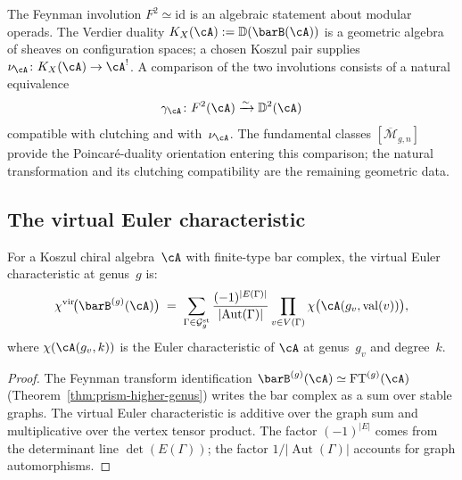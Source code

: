 \begin{remark}%
\label{rem:feynman-vs-verdier}
The Feynman involution $F^2 \simeq \mathrm{id}$ is an algebraic
statement about modular operads. The Verdier duality
$K_X(\cA):=\mathbb{D}(\barB(\cA))$ is a geometric algebra of sheaves
on configuration spaces; a chosen Koszul pair supplies
$\nu_\cA\colon K_X(\cA)\to\cA^!$.  A comparison of the two
involutions consists of a natural equivalence
\[
\gamma_\cA\colon F^2(\cA)\xrightarrow{\sim}
\mathbb D^2(\cA)
\]
compatible with clutching and with~$\nu_\cA$.  The fundamental classes
$[\overline{\mathcal{M}}_{g,n}]$ provide the Poincar\'e-duality
orientation entering this comparison; the natural transformation
and its clutching compatibility are the remaining geometric data.
\end{remark}

\subsection{The virtual Euler characteristic}
\label{subsec:virtual-euler-char}

\begin{theorem}\label{thm:virtual-euler-char}
For a Koszul chiral algebra~$\cA$ with finite-type bar complex,
the virtual Euler characteristic at genus~$g$ is:
\begin{equation}\label{eq:virtual-euler-graph}
\chi^{\mathrm{vir}}\!\bigl(\barB^{(g)}(\cA)\bigr)
\;=\;
\sum_{\Gamma \in \mathcal{G}_g^{\mathrm{st}}}
\frac{(-1)^{|E(\Gamma)|}}{|\!\operatorname{Aut}(\Gamma)|}
\prod_{v \in V(\Gamma)}
\chi\bigl(\cA(g_v, \mathrm{val}(v))\bigr),
\end{equation}
where $\chi(\cA(g_v, k))$ is the Euler characteristic of
$\cA$ at genus~$g_v$ and degree~$k$.
\end{theorem}

\begin{proof}
The Feynman transform identification
$\barB^{(g)}(\cA) \simeq \mathrm{FT}^{(g)}(\cA)$
(Theorem~\ref{thm:prism-higher-genus}) writes the bar complex
as a sum over stable graphs. The virtual Euler characteristic is
additive over the graph sum and multiplicative over the vertex
tensor product. The factor $(-1)^{|E|}$ comes from the
determinant line $\det(E(\Gamma))$; the factor
$1/|\!\operatorname{Aut}(\Gamma)|$ accounts for graph
automorphisms.
\end{proof}

